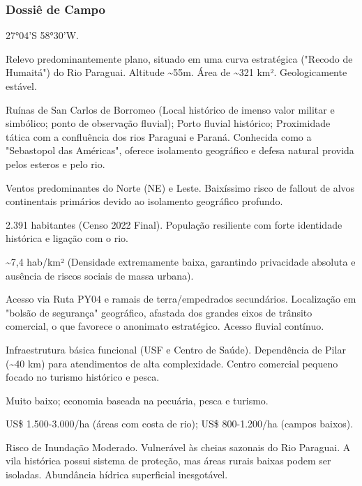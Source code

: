 \subsubsection{Dossiê de Campo}
\begin{description}[style=nextline,leftmargin=0.5cm,font=\bfseries]
\item[Coordenadas]  27°04'S 58°30'W.
\item[Topografia]  Relevo predominantemente plano, situado em uma curva estratégica ("Recodo de Humaitá") do Rio Paraguai. Altitude \textasciitilde 55m. Área de \textasciitilde 321 km². Geologicamente estável.
\item[Alvos Estratégicos]  Ruínas de San Carlos de Borromeo (Local histórico de imenso valor militar e simbólico; ponto de observação fluvial); Porto fluvial histórico; Proximidade tática com a confluência dos rios Paraguai e Paraná. Conhecida como a "Sebastopol das Américas", oferece isolamento geográfico e defesa natural provida pelos esteros e pelo rio.
\item[Fallout]  Ventos predominantes do Norte (NE) e Leste. Baixíssimo risco de fallout de alvos continentais primários devido ao isolamento geográfico profundo.
\item[População]  2.391 habitantes (Censo 2022 Final). População resiliente com forte identidade histórica e ligação com o rio.
\item[Densidade]  \textasciitilde 7,4 hab/\allowbreak km² (Densidade extremamente baixa, garantindo privacidade absoluta e ausência de riscos sociais de massa urbana).
\item[Vias de Acesso]  Acesso via Ruta PY04 e ramais de terra/\allowbreak empedrados secundários. Localização em "bolsão de segurança" geográfico, afastada dos grandes eixos de trânsito comercial, o que favorece o anonimato estratégico. Acesso fluvial contínuo.
\item[Serviços]  Infraestrutura básica funcional (USF e Centro de Saúde). Dependência de Pilar (\textasciitilde 40 km) para atendimentos de alta complexidade. Centro comercial pequeno focado no turismo histórico e pesca.
\item[Custo de Vida]  Muito baixo; economia baseada na pecuária, pesca e turismo.
\item[Preço da Terra]  US\$ 1.500-3.000/\allowbreak ha (áreas com costa de rio); US\$ 800-1.200/\allowbreak ha (campos baixos).
\item[Hidrologia]  Risco de Inundação Moderado. Vulnerável às cheias sazonais do Rio Paraguai. A vila histórica possui sistema de proteção, mas áreas rurais baixas podem ser isoladas. Abundância hídrica superficial inesgotável.

\end{description}
